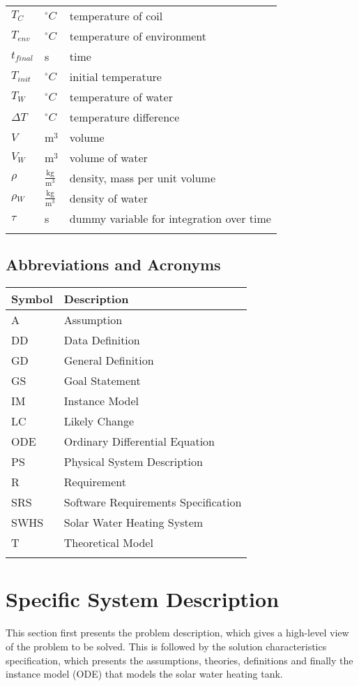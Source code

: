 \documentclass[12pt]{article}
\begin{document}
\begin{longtable*}{l l l}
\\
$T_{C}$ & ${}^{\circ}C$ & temperature of coil
\\
$T_{env}$ & ${}^{\circ}C$ & temperature of environment
\\
$t_{final}$ & s & time
\\
$T_{init}$ & ${}^{\circ}C$ & initial temperature
\\
$T_{W}$ & ${}^{\circ}C$ & temperature of water
\\
$\Delta{}T$ & ${}^{\circ}C$ & temperature difference
\\
$V$ & $\text{m}^{3}$ & volume
\\
$V_{W}$ & $\text{m}^{3}$ & volume of water
\\
$\rho{}$ & $\frac{\text{kg}}{\text{m}^{3}}$ & density, mass per unit volume
\\
$\rho{}_{W}$ & $\frac{\text{kg}}{\text{m}^{3}}$ & density of water
\\
$\tau{}$ & s & dummy variable for integration over time
\\
\bottomrule
\label{Table:ToS}
\end{longtable*}
\subsection{Abbreviations and Acronyms}
\label{Sec:AaA}
\begin{longtable*}{l l}
\toprule
Symbol & Description
\\
\midrule
A & Assumption
\\
DD & Data Definition
\\
GD & General Definition
\\
GS & Goal Statement
\\
IM & Instance Model
\\
LC & Likely Change
\\
ODE & Ordinary Differential Equation
\\
PS & Physical System Description
\\
R & Requirement
\\
SRS & Software Requirements Specification
\\
SWHS & Solar Water Heating System
\\
T & Theoretical Model
\\
\bottomrule
\label{Table:AaA}
\end{longtable*}
\section{Specific System Description}
\label{Sec:SSD}
This section first presents the problem description, which gives a high-level view of the problem to be solved. This is followed by the solution characteristics specification, which presents the assumptions, theories, definitions and finally the instance model (ODE) that models the solar water heating tank.
\end{document}
